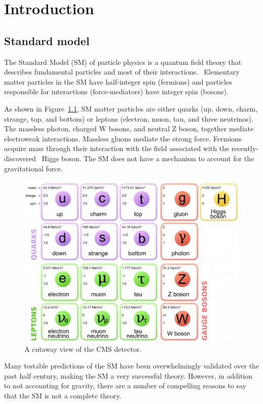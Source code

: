 \chapter{Introduction}


\section{Standard model}

The Standard Model (SM) of particle physics is a
quantum field theory that describes fundamental particles and most of their
interactions.~\cite{THEORY:Glashow1961tr,THEORY:Weinberg1967tq,THEORY:Salam1968rm}
Elementary matter particles in the SM have half-integer spin
(fermions) and particles responsible for interactions (force-mediators) have
integer spin (bosons).

As shown in Figure~\ref{fig:smtable}, SM matter particles are either quarks
(up, down, charm, strange, top, and bottom) or leptons (electron, muon, tau,
and three neutrinos). The massless photon, charged W bosons, and neutral Z
boson, together mediate electroweak interactions. Massless gluons mediate the
strong force. Fermions acquire mass through their interaction with the field
associated with the
recently-discovered~\cite{CMS:HiggsObservation,ATLAS:HiggsObservation} Higgs
boson. The SM does not have a mechanism to account for the gravitational
force.


\begin{figure}[!htbp]
    \centering
    \includegraphics[width=0.75\linewidth]{figs/misc/smtable.jpg}
    \caption{
        A cutaway view of the CMS detector.
    }
    \label{fig:smtable}
\end{figure}

Many testable predictions of the SM have been overwhelmingly validated over
the past half century, making the SM a very successful theory.
However, in addition to not accounting for gravity, there are a number
of compelling reasons to say that the SM is not a complete theory.

